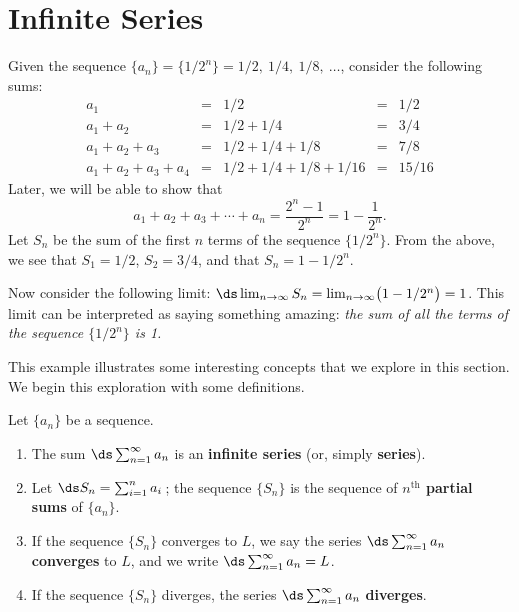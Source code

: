 \section{Infinite Series}\label{sec:series}

Given the sequence $\{a_n\} = \{1/2^n\} = 1/2,\ 1/4,\ 1/8,\ \dotsc$, consider the following sums:\vspace{-.5\baselineskip}
\[
\begin{array}{ccccc}
a_1				&=& 1/2					&=& 1/2\\
a_1+a_2			&=& 1/2+1/4				&=& 3/4\\
a_1+a_2+a_3		&=& 1/2+1/4+1/8			&=& 7/8\\
a_1+a_2+a_3+a_4	&=& 1/2+1/4+1/8+1/16		&=& 15/16
\end{array}
\]
Later, we will be able to show that\vspace{-.5\baselineskip}
\[a_1+a_2+a_3+\dotsb+a_n = \frac{2^n-1}{2^n} = 1-\frac{1}{2^n}.\]
Let $S_n$ be the sum of the first $n$ terms of the sequence $\{1/2^n\}$. From the above, we see that $S_1=1/2$, $S_2 = 3/4$, and that $S_n = 1-1/2^n$. 

Now consider the following limit: $\ds \lim_{n\to\infty}S_n = \lim_{n\to\infty}\bigl(1-1/2^n\bigr) = 1$. This limit can be interpreted as saying something amazing: \emph{the sum of \emph{all} the terms of the sequence $\{1/2^n\}$ is 1.} 


This example illustrates some interesting concepts that we explore in this section. We begin this exploration with some definitions.

{
\begin{definition}\label{def:series}
Let $\{a_n\}$ be a sequence.
\begin{enumerate}
\item		The sum $\ds \sum_{n=1}^\infty a_n$ is an \textbf{infinite series} (or, simply \textbf{series}).
\item		Let $\ds S_n = \sum_{i=1}^n a_i$\,; the sequence $\{S_n\}$ is the sequence of \textbf{$n^\text{th}$ partial sums} of $\{a_n\}$.\vspace{-.5\baselineskip}
\item		If the sequence $\{S_n\}$ converges to $L$, we say the series $\ds \sum_{n=1}^\infty a_n$ \textbf{converges} to $L$, and we write $\ds \sum_{n=1}^\infty a_n = L$.\vspace{-.5\baselineskip}
\item		If the sequence $\{S_n\}$ diverges, the series $\ds \sum_{n=1}^\infty a_n$ \textbf{diverges}.
\end{enumerate}
\end{definition}}

